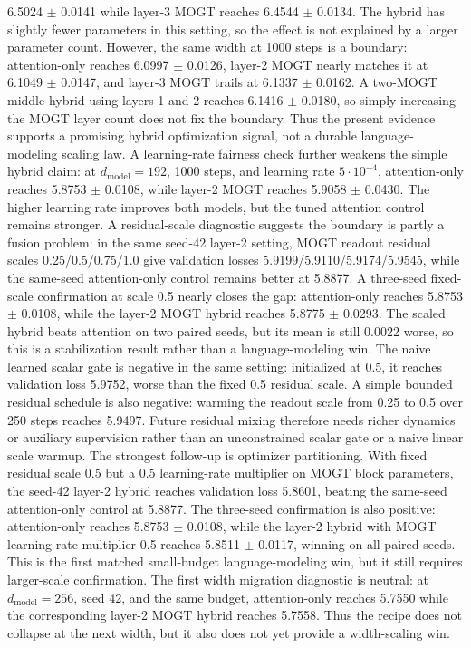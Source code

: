 \documentclass[10pt]{article}
\newcommand{\mogt}{MOGT}
\begin{document}
6.5024 $\pm$ 0.0141 while layer-3 \mogt{} reaches 6.4544 $\pm$ 0.0134. The
hybrid has slightly fewer parameters in this setting, so the effect is not
explained by a larger parameter count.
However, the same width at 1000 steps is a boundary: attention-only reaches
6.0997 $\pm$ 0.0126, layer-2 \mogt{} nearly matches it at
6.1049 $\pm$ 0.0147, and layer-3 \mogt{} trails at
6.1337 $\pm$ 0.0162. A two-\mogt{} middle hybrid using layers 1 and 2 reaches
6.1416 $\pm$ 0.0180, so simply increasing the \mogt{} layer count does not fix
the boundary. Thus the present evidence supports a promising hybrid
optimization signal, not a durable language-modeling scaling law.
A learning-rate fairness check further weakens the simple hybrid claim:
at $d_{\mathrm{model}}=192$, 1000 steps, and learning rate $5\cdot10^{-4}$,
attention-only reaches 5.8753 $\pm$ 0.0108, while layer-2 \mogt{} reaches
5.9058 $\pm$ 0.0430. The higher learning rate improves both models, but the
tuned attention control remains stronger.
A residual-scale diagnostic suggests the boundary is partly a fusion problem:
in the same seed-42 layer-2 setting, \mogt{} readout residual scales
0.25/0.5/0.75/1.0 give validation losses
5.9199/5.9110/5.9174/5.9545, while the same-seed attention-only control
remains better at 5.8877. A three-seed fixed-scale confirmation at scale 0.5
nearly closes the gap: attention-only reaches 5.8753 $\pm$ 0.0108, while the
layer-2 \mogt{} hybrid reaches 5.8775 $\pm$ 0.0293. The scaled hybrid beats
attention on two paired seeds, but its mean is still 0.0022 worse, so this is a
stabilization result rather than a language-modeling win.
The naive learned scalar gate is negative in the same setting: initialized at
0.5, it reaches validation loss 5.9752, worse than the fixed 0.5 residual
scale. A simple bounded residual schedule is also negative: warming the readout
scale from 0.25 to 0.5 over 250 steps reaches 5.9497. Future residual mixing
therefore needs richer dynamics or auxiliary supervision rather than an
unconstrained scalar gate or a naive linear scale warmup.
The strongest follow-up is optimizer partitioning. With fixed residual scale
0.5 but a 0.5 learning-rate multiplier on MOGT block parameters, the seed-42
layer-2 hybrid reaches validation loss 5.8601, beating the same-seed
attention-only control at 5.8877. The three-seed confirmation is also positive:
attention-only reaches 5.8753 $\pm$ 0.0108, while the layer-2 hybrid with
\mogt{} learning-rate multiplier 0.5 reaches 5.8511 $\pm$ 0.0117, winning on
all paired seeds. This is the first matched small-budget language-modeling
win, but it still requires larger-scale confirmation.
The first width migration diagnostic is neutral: at $d_{\mathrm{model}}=256$,
seed 42, and the same budget, attention-only reaches 5.7550 while the
corresponding layer-2 \mogt{} hybrid reaches 5.7558. Thus the recipe does not
collapse at the next width, but it also does not yet provide a width-scaling
win.
\end{document}

